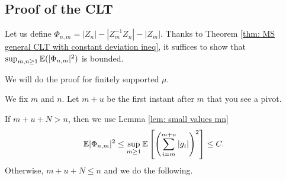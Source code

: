 \subsection{Proof of the CLT}

Let us define $\Phi_{n,m}=|Z_n|-|Z_m^{-1}Z_n|-|Z_m|$. Thanks to Theorem \ref{thm: MS general CLT with constant deviation ineq}, it suffices to show that $\sup_{m,n\ge 1}\mathbb{E}(|\Phi_{n,m}|^2)$ is bounded.

We will do the proof for finitely supported $\mu$.

We fix $m$ and $n$. Let $m+u$ be the first instant after $m$ that you see a pivot.

If $m+u+N>n$, then we use Lemma \ref{lem: small values mn} 
$$
\mathbb{E} |\Phi_{n,m}|^2\le \sup_{m\ge 1}\mathbb{E}\left[\left( \sum_{i=m}^{m+u}|g_i| \right)^2\right]\le C.
$$
Otherwise, $m+u+N\le n$ and we do the following.


